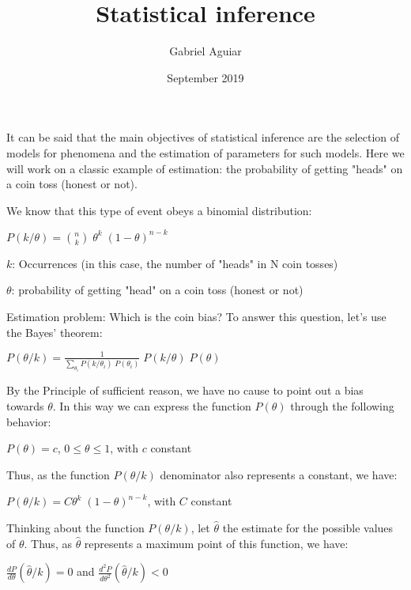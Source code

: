 \documentclass{article}
\title{Statistical inference}
\author{Gabriel Aguiar}
\date{September 2019}
\begin{document}
\maketitle

It can be said that the main objectives of statistical inference are the selection of models for phenomena and the estimation of parameters for such models. Here we will work on a classic example of estimation: the probability of getting "heads" on a coin toss (honest or not).

We know that this type of event obeys a binomial distribution:

\hfill

$P(k/\theta) = \binom{n}{k} \; \theta^{k} \; (1 - \theta)^{n - k}$

\hfill

$k$: Occurrences (in this case, the number of "heads" in N coin tosses)

$\theta$: probability of getting "head" on a coin toss (honest or not)

\hfill

Estimation problem: Which is the coin bias? To answer this question, let's use the Bayes' theorem:

\hfill

$P(\theta/k) = \frac{1}{\sum\limits_{\theta_{i}} P(k/\theta_{i}) \; P(\theta_{i})} \; P(k/\theta) \; P(\theta)$

\hfill

By the Principle of sufficient reason, we have no cause to point out a bias towards $\theta$. In this way we can express the function $P(\theta)$ through the following behavior:

\hfill

$P(\theta) = c$, $0 \leq \theta \leq 1$, with $c$ constant

\hfill

Thus, as the function $P(\theta/k)$ denominator also represents a constant, we have:

\hfill

$P(\theta/k) = C \theta^{k} \; (1 - \theta)^{n - k}$, with $C$ constant

\hfill

Thinking about the function $P(\theta/k)$, let $\hat{\theta}$ the estimate for the possible values of $\theta$. Thus, as $\hat{\theta}$ represents a maximum point of this function, we have:

\hfill

$\frac{dP}{d\theta} (\hat{\theta}/k) = 0$ and $\frac{d^{2}P}{d\theta^{2}} (\hat{\theta}/k) < 0$
\end{document}
